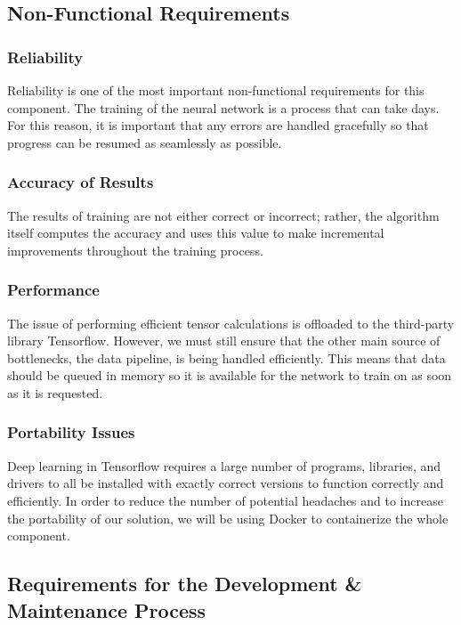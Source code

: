 \documentclass[12pt]{article}
\begin{document}
\subsection{Non-Functional Requirements}

\subsubsection {Reliability}

Reliability is one of the most important non-functional requirements for this component. The training of the neural network is a process that can take days. For this reason, it is important that any errors are handled gracefully so that progress can be resumed as seamlessly as possible.

\subsubsection {Accuracy of Results}
 
The results of training are not either correct or incorrect; rather, the algorithm itself computes the accuracy and uses this value to make incremental improvements throughout the training process.

\subsubsection {Performance}

The issue of performing efficient tensor calculations is offloaded to the third-party library Tensorflow. However, we must still ensure that the other main source of bottlenecks, the data pipeline, is being handled efficiently. This means that data should be queued in memory so it is available for the network to train on as soon as it is requested.

\subsubsection {Portability Issues}

Deep learning in Tensorflow requires a large number of programs, libraries, and drivers to all be installed with exactly correct versions to function correctly and efficiently. In order to reduce the number of potential headaches and to increase the portability of our solution, we will be using Docker to containerize the whole component.

\subsection{Requirements for the Development & Maintenance Process}
\end{document}
